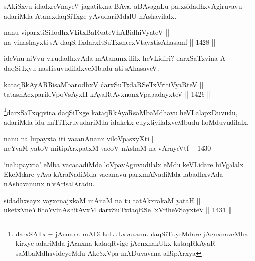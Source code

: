 \begin{artha}
sAkiSxyu idadxreVnayeV jagatitxna BAva, aBAvagaLu parxsidadhxvAgiruvavu adariMda AtamxdaqSiTxge yAvudariMdalU nAshavilalx.
\end{artha}


\begin{shl}
nanu viparxtiSidodhxVkitxBaRvateVhABidhiVyateV || \\
na vinashayxti sA daqSiTxdarxRSuTxshecxVtayxtisAhasamf \hfill || 1428 ||  
\end{shl}

\begin{artha}
ideVnu niVvu virudadhxvAda mAtanunx ililx heVLidiri? darxSaTxvina A daqSiTxyu nashisuvudilalxveMbudu ati sAhasaveV.
\end{artha}


\begin{shl}
kataqRkAyARBisaMbanodhxV darxSuTxdaRSeTxVritiVyaRteV || \\
tatashAcxpariloVpoV\s sAyxH kAyaRtAvxnonxVpapadayxteV \hfill || 1429 ||  
\end{shl}

\begin{artha}
\footnote{darxSATx = jAcnxna mADi koLuLxvavanu. daqSiTxyeMdare jAcnxnaveMba kirxye adariMda jAcnxna kataqRvige jAcnxnakUkx kataqRkAyaR saMbaMdhavideyeMdu AkeSxVpa mADuvavana aBipArxya}darxSaTxqqvina daqSiTxge kataqRkAyaRsaMbaMdhavu heVLalapxDuvudu, adariMda idu huTiTxruvudariMda idakekx cuyxtiyilalxveMbudu hoMduvudilalx.
\end{artha}


\begin{shl}
nanu na lupayxta iti vacanAnanx viloVpasxyXti || \\
neYvaM yatoV mitipArxpatxM vacoV nAshaM na vArayeVtf \hfill || 1430 ||  
\end{shl}

\begin{artha}
`nalupayxta' eMba vacanadiMda loVpavAguvudilalx eMdu keVLidare hiVgalalx EkeMdare yAva kAraNadiMda vacanavu parxmANadiMda labadhxvAda nAshavanunx nivArisalAradu.
\end{artha}


\begin{shl}
sidadhxsayx vayxcnajxkaM mAnaM na tu tatAkxrakaM yataH || \\
uketxVneYRtoV\s vinAshitAvxM darxSuTxdaqRSeTxVriheVSayxteV \hfill || 1431 ||  
\end{shl}


